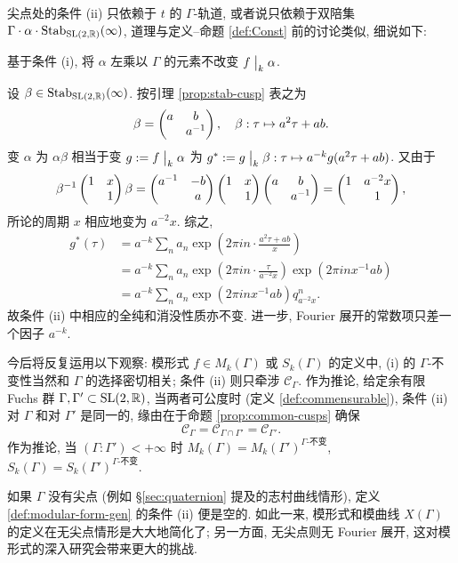 尖点处的条件 (ii) 只依赖于 $t$ 的 $\Gamma$-轨道, 或者说只依赖于双陪集 $\Gamma \cdot \alpha \cdot \operatorname{Stab}_{\operatorname{SL}(2,\mathbb{R})}(\infty)$, 道理与定义--命题 \ref{def:Const} 前的讨论类似, 细说如下:
\begin{compactitem}
	\item 基于条件 (i), 将 $\alpha$ 左乘以 $\Gamma$ 的元素不改变 $f \;\big|_{k} \; \alpha$.
	\item 设 $\beta \in \operatorname{Stab}_{\operatorname{SL}(2,\mathbb{R})}(\infty)$. 按引理 \ref{prop:stab-cusp} 表之为
	\[ \beta = \begin{pmatrix} a & b \\  & a^{-1} \end{pmatrix}, \quad \beta: \tau \mapsto a^2 \tau + ab. \]
	变 $\alpha$ 为 $\alpha\beta$ 相当于变 $g := f \;\big|_{k} \; \alpha$ 为 $g^* := g \;\big|_{k} \; \beta: \tau \mapsto a^{-k} g(a^2 \tau + ab)$. 又由于
	\[ \beta^{-1} \begin{pmatrix} 1 & x \\  & 1 \end{pmatrix} \beta = \begin{pmatrix} a^{-1} & -b \\  & a \end{pmatrix} \begin{pmatrix} 1 & x \\  & 1 \end{pmatrix} \begin{pmatrix} a & b \\  & a^{-1} \end{pmatrix} = \begin{pmatrix} 1 & a^{-2} x \\  & 1 \end{pmatrix}, \]
	所论的周期 $x$ 相应地变为 $a^{-2} x$. 综之,
	\begin{align*}
		g^*(\tau) & = a^{-k} \sum_n a_n \exp\left( 2\pi i n \cdot \frac{a^2 \tau + ab}{x} \right) \\
		& = a^{-k} \sum_n a_n \exp\left( 2\pi i n \cdot \frac{\tau}{a^{-2}x} \right) \exp\left( 2\pi i n x^{-1} ab \right) \\
		& = a^{-k} \sum_n a_n \exp\left( 2\pi i n x^{-1} ab \right) q_{a^{-2}x}^n.
	\end{align*}
	故条件 (ii) 中相应的全纯和消没性质亦不变. 进一步, Fourier 展开的常数项只差一个因子 $a^{-k}$.
\end{compactitem}

\begin{remark}\label{rem:common-cusps}
	今后将反复运用以下观察: 模形式 $f \in M_k(\Gamma)$ 或 $S_k(\Gamma)$ 的定义中, (i) 的 $\Gamma$-不变性当然和 $\Gamma$ 的选择密切相关; 条件 (ii) 则只牵涉 $\mathcal{C}_\Gamma$. 作为推论, 给定余有限 Fuchs 群 $\Gamma, \Gamma' \subset \operatorname{SL}(2,\mathbb{R})$, 当两者可公度时 (定义 \ref{def:commensurable}), 条件 (ii) 对 $\Gamma$ 和对 $\Gamma'$ 是同一的, 缘由在于命题 \ref{prop:common-cusps} 确保
	\[ \mathcal{C}_\Gamma = \mathcal{C}_{\Gamma \cap \Gamma'} = \mathcal{C}_{\Gamma'}. \]
	作为推论, 当 $(\Gamma:\Gamma') < +\infty$ 时 $M_k(\Gamma) = M_k(\Gamma')^{\Gamma\text{-不变}}$, $S_k(\Gamma) = S_k(\Gamma')^{\Gamma\text{-不变}}$.
\end{remark}

\begin{remark}
	如果 $\Gamma$ 没有尖点 (例如 \S\ref{sec:quaternion} 提及的志村曲线情形), 定义 \ref{def:modular-form-gen} 的条件 (ii) 便是空的. 如此一来, 模形式和模曲线 $X(\Gamma)$ 的定义在无尖点情形是大大地简化了; 另一方面, 无尖点则无 Fourier 展开, 这对模形式的深入研究会带来更大的挑战.
\end{remark}

